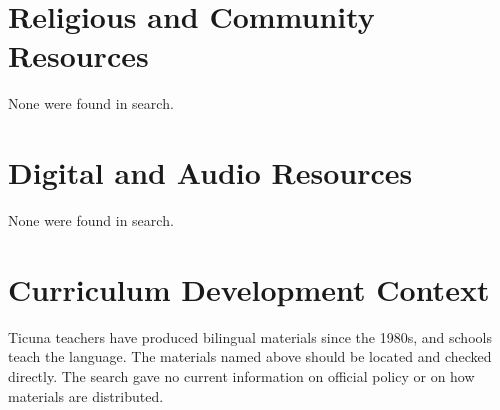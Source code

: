 \documentclass[12pt]{article}
\begin{document}
\section{Religious and Community Resources}
None were found in search.

\section{Digital and Audio Resources}
None were found in search.

\section{Curriculum Development Context}
Ticuna teachers have produced bilingual materials since the 1980s, and schools teach the language. The materials named above should be located and checked directly. The search gave no current information on official policy or on how materials are distributed.
\end{document}
